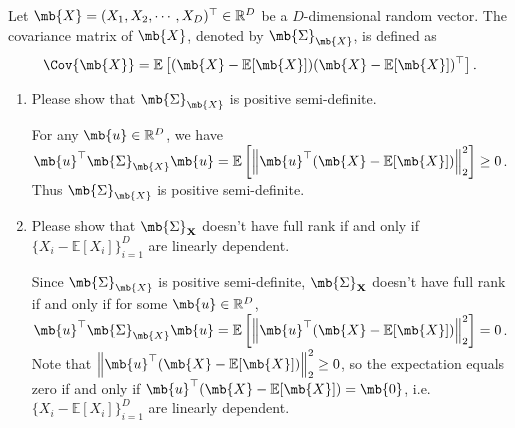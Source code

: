 \begin{exercise}
\begin{enumerate}
    \end{enumerate}
\end{exercise}
\newpage




\begin{exercise} Let $\mb{X}=(X_1,X_2,\cdots,X_D)^\top \in \mathbb{R}^D$ be a  $D$-dimensional random vector. The covariance matrix of $\mb{X}$, denoted by $\mb{\Sigma}_\mb{X}$, is defined as
    $$
        \Cov{\mb{X}}=\mathbb{E}\left[(\mb{X}-\mathbb{E}[\mb{X}])(\mb{X}-\mathbb{E}[\mb{X}])^\top \right].
    $$
    \begin{enumerate}
        \item
            Please show that $\mb{\Sigma}_{\mb{X}}$ is positive semi-definite.
            
            \begin{solution}
                For any $\mb{u}\in \mathbb{R}^D$, we have $\mb{u}^\top\mb{\Sigma}_{\mb{X}}\mb{u} = \mathbb{E}\left[\left\|\mb{u}^\top(\mb{X}-\mathbb{E}[\mb{X}])\right\|^2_2\right] \geq 0$. Thus $\mb{\Sigma}_{\mb{X}}$ is positive semi-definite.
                \qedhere
            \end{solution}
            
        \item Please show that $\mb{\Sigma}_\textbf{X}$ doesn't have full rank if and only if $\{X_i-\mathbb{E}[X_i]\}_{i=1}^D$ are linearly dependent.
            
            \begin{solution}
                Since $\mb{\Sigma}_{\mb{X}}$ is positive semi-definite, $\mb{\Sigma}_\textbf{X}$ doesn't have full rank if and only if for some $\mb{u}\in \mathbb{R}^D$, $\mb{u}^\top\mb{\Sigma}_{\mb{X}}\mb{u} = \mathbb{E}\left[\left\|\mb{u}^\top(\mb{X}-\mathbb{E}[\mb{X}])\right\|^2_2\right] = 0$. Note that $\left\|\mb{u}^\top(\mb{X}-\mathbb{E}[\mb{X}])\right\|^2_2\ge0$, so the expectation equals zero if and only if $\mb{u}^\top(\mb{X}-\mathbb{E}[\mb{X}])=\mb{0}$, i.e. $\{X_i-\mathbb{E}[X_i]\}_{i=1}^D$ are linearly dependent. \qedhere
            \end{solution}
            

\end{enumerate}
\end{exercise}
